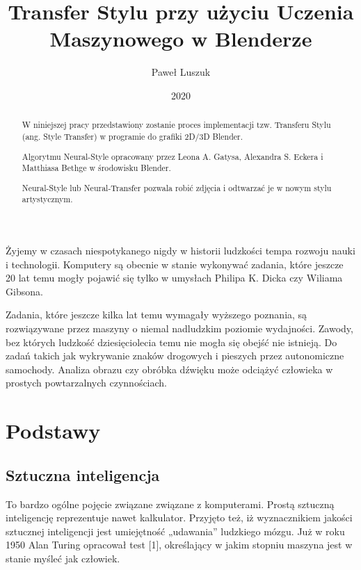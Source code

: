 \documentclass[brudnopis]{xmgr}
\author   {Paweł Luszuk}
\title    {Transfer Stylu przy użyciu Uczenia Maszynowego w Blenderze}
\date     {2020}
\begin{document}
\begin{abstract}
W niniejszej pracy przedstawiony zostanie proces implementacji tzw. Transferu Stylu (ang. Style Transfer) w programie do grafiki 2D/3D Blender.

Algorytmu Neural-Style opracowany przez Leona A. Gatysa, Alexandra S. Eckera i Matthiasa Bethge w środowisku Blender.

Neural-Style lub Neural-Transfer pozwala robić zdjęcia i odtwarzać je w nowym stylu artystycznym. 
\end{abstract}


\maketitle

\introduction

Żyjemy w czasach niespotykanego nigdy w historii ludzkości tempa rozwoju nauki i technologii. Komputery są obecnie w stanie wykonywać zadania, które jeszcze 20 lat temu mogły pojawić się tylko w umysłach Philipa K. Dicka czy Wiliama Gibsona.

Zadania, które jeszcze kilka lat temu wymagały wyższego poznania, są rozwiązywane przez maszyny o niemal nadludzkim poziomie wydajności. Zawody, bez których ludzkość dziesięciolecia temu nie mogła się obejść nie istnieją. Do zadań takich jak wykrywanie znaków drogowych i pieszych przez autonomiczne samochody. Analiza obrazu czy obróbka dźwięku może odciążyć człowieka w prostych powtarzalnych czynnościach.


\chapter{Podstawy\label{s:dtd}}

\section{Sztuczna inteligencja}

To bardzo ogólne pojęcie związane związane z komputerami. Prostą sztuczną inteligencję reprezentuje nawet kalkulator. Przyjęto też, iż wyznacznikiem jakości sztucznej inteligencji jest umiejętność „udawania” ludzkiego mózgu. Już w roku 1950 Alan Turing opracował test [1], określający w jakim stopniu maszyna jest w stanie myśleć jak człowiek.
\end{document}
